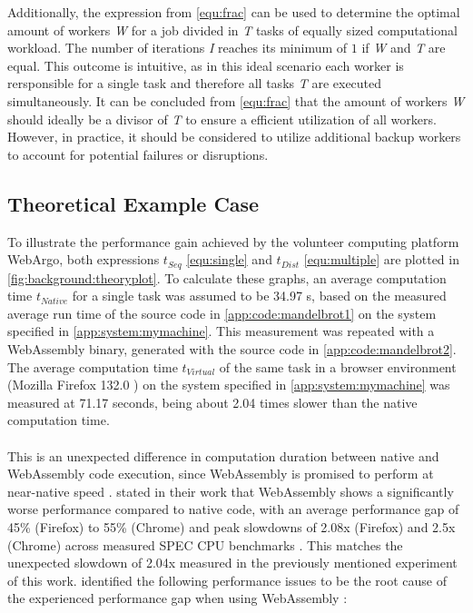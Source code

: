 Additionally, the expression from \eqref{equ:frac} can be used to determine the optimal amount of workers \emph{W} for a job divided in \emph{T} tasks of equally sized computational workload. The number of iterations \emph{I} reaches its minimum of $1$ if \emph{W} and \emph{T} are equal. This outcome is intuitive, as in this ideal scenario each worker is rersponsible for a single task and therefore all tasks \emph{T} are executed simultaneously. It can be concluded from \eqref{equ:frac} that the amount of workers \emph{W} should ideally be a divisor of \emph{T} to ensure a efficient utilization of all workers. However, in practice, it should be considered to utilize additional backup workers to account for potential failures or disruptions.

\subsection{Theoretical Example Case}
\label{subsec:concept:theroy_example}
To illustrate the performance gain achieved by the volunteer computing platform WebArgo, both expressions $t_{Seq}$ \eqref{equ:single} and $t_{Dist}$ \eqref{equ:multiple} are plotted in \autoref{fig:background:theoryplot}. To calculate these graphs, an average computation time $t_{Native}$ for a single task was assumed to be 34.97 s, based on the measured average run time of the source code in \autoref{app:code:mandelbrot1} on the system specified in \autoref{app:system:mymachine}. This measurement was repeated with a WebAssembly binary, generated with the source code in \autoref{app:code:mandelbrot2}. The average computation time $t_{Virtual}$ of the same task in a browser environment (Mozilla Firefox 132.0 \cite{background:firefox}) on the system specified in \autoref{app:system:mymachine} was measured at 71.17 seconds, being about 2.04 times slower than the native computation time.
\\~\\
This is an unexpected difference in computation duration between native and WebAssembly code execution, since WebAssembly is promised to perform at near-native speed \cite{methodology:wasm, methodology:wasmW3C}. \citeauthor{background:not-so-fast} stated in their work that WebAssembly shows a significantly worse performance compared to native code, with an average performance gap of 45\% (Firefox) to 55\% (Chrome) and peak slowdowns of 2.08x (Firefox) and 2.5x (Chrome) across measured SPEC \acs{CPU} benchmarks \cite{background:not-so-fast}. This matches the unexpected slowdown of 2.04x measured in the previously mentioned experiment of this work. \citeauthor{background:not-so-fast} identified the following performance issues to be the root cause of the experienced performance gap when using WebAssembly \cite{background:not-so-fast}:
